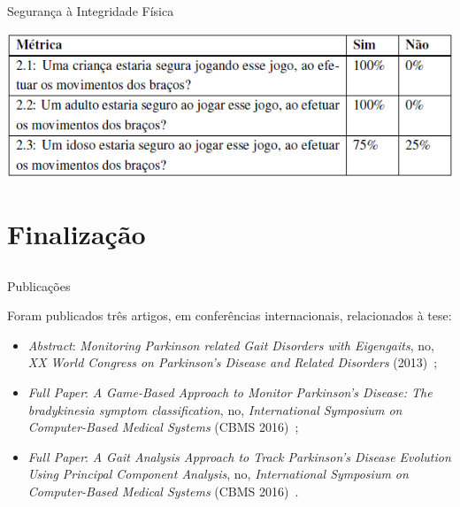 \documentclass{beamer}
\begin{document}
\begin{frame}{Segurança à Integridade Física} 
    \begin{block}{}
			\center \includegraphics[height=1.4 in]{img/metricasq2.png}
    \end{block}
\end{frame}


\section{Finalização}
\subsection{}
\begin{frame}{Publicações}
\begin{block}{}
Foram publicados três artigos, em conferências internacionais, relacionados à tese: 
  \begin{itemize}
   \item \textit{Abstract}: \textit{Monitoring Parkinson related Gait Disorders with Eigengaits}, no, \textit{XX World Congress on Parkinson's Disease and Related Disorders} (2013)~\cite{lmmeigengaits2013};
   \item \textit{Full Paper}: \textit{A Game-Based Approach to Monitor Parkinson’s Disease: The bradykinesia symptom classification}, no, \textit{International Symposium on Computer-Based Medical Systems} (CBMS 2016)~\cite{lmmcbmsgame2016};
   \item \textit{Full Paper}: \textit{A Gait Analysis Approach to Track Parkinson’s Disease Evolution Using Principal Component Analysis}, no, \textit{International Symposium on Computer-Based Medical Systems} (CBMS 2016)~\cite{lmmcbmsgait2016}.
  \end{itemize}
\end{block}
\end{frame}
\end{document}
